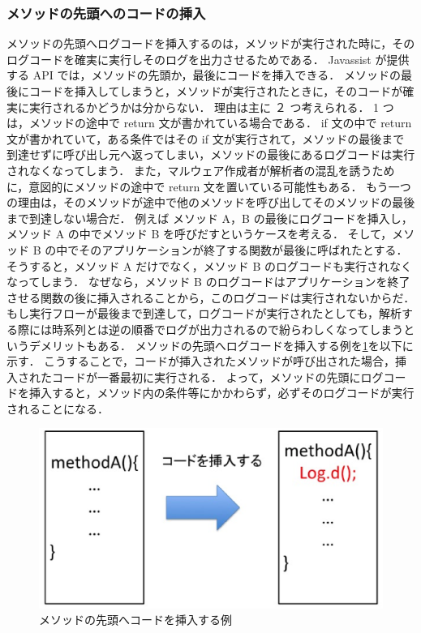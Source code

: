 \subsubsection{メソッドの先頭へのコードの挿入}
 \label{methodtop}
メソッドの先頭へログコードを挿入するのは，メソッドが実行された時に，そのログコードを確実に実行しそのログを出力させるためである．
Javassist が提供する API では，メソッドの先頭か，最後にコードを挿入できる．
メソッドの最後にコードを挿入してしまうと，メソッドが実行されたときに，そのコードが確実に実行されるかどうかは分からない．
理由は主に ２ つ考えられる．
1 つは，メソッドの途中で return 文が書かれている場合である．
if 文の中で return 文が書かれていて，ある条件ではその if 文が実行されて，メソッドの最後まで到達せずに呼び出し元へ返ってしまい，メソッドの最後にあるログコードは実行されなくなってしまう．
また，マルウェア作成者が解析者の混乱を誘うために，意図的にメソッドの途中で return 文を置いている可能性もある．
もう一つの理由は，そのメソッドが途中で他のメソッドを呼び出してそのメソッドの最後まで到達しない場合だ．
例えば メソッド A，B の最後にログコードを挿入し，メソッド A の中でメソッド B を呼びだすというケースを考える．
そして，メソッド B の中でそのアプリケーションが終了する関数が最後に呼ばれたとする．
そうすると，メソッド A だけでなく，メソッド B のログコードも実行されなくなってしまう．
なぜなら，メソッド B のログコードはアプリケーションを終了させる関数の後に挿入されることから，このログコードは実行されないからだ．
もし実行フローが最後まで到達して，ログコードが実行されたとしても，解析する際には時系列とは逆の順番でログが出力されるので紛らわしくなってしまうというデメリットもある．
メソッドの先頭へログコードを挿入する例を\ref{insertbefore}を以下に示す．
こうすることで，コードが挿入されたメソッドが呼び出された場合，挿入されたコードが一番最初に実行される．
よって，メソッドの先頭にログコードを挿入すると，メソッド内の条件等にかかわらず，必ずそのログコードが実行されることになる．

\begin{figure}[t]
\begin{center}
\includegraphics[scale=0.3]{image2.eps}
\end{center}
\caption{メソッドの先頭へコードを挿入する例}
\label{insertbefore}
\end{figure}

